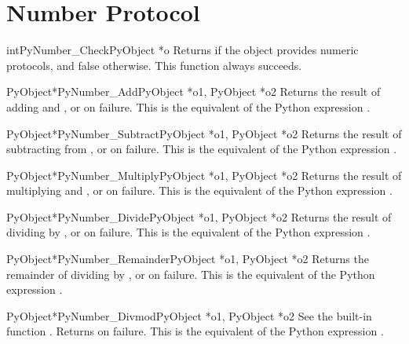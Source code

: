 \documentclass{manual}
\begin{document}
\section{Number Protocol \label{number}}

\begin{cfuncdesc}{int}{PyNumber_Check}{PyObject *o}
Returns  if the object  provides numeric protocols, and
false otherwise. 
This function always succeeds.
\end{cfuncdesc}


\begin{cfuncdesc}{PyObject*}{PyNumber_Add}{PyObject *o1, PyObject *o2}
Returns the result of adding  and , or \NULL{} on
failure.  This is the equivalent of the Python expression
.
\end{cfuncdesc}


\begin{cfuncdesc}{PyObject*}{PyNumber_Subtract}{PyObject *o1, PyObject *o2}
Returns the result of subtracting  from , or
\NULL{} on failure.  This is the equivalent of the Python expression
.
\end{cfuncdesc}


\begin{cfuncdesc}{PyObject*}{PyNumber_Multiply}{PyObject *o1, PyObject *o2}
Returns the result of multiplying  and , or \NULL{} on
failure.  This is the equivalent of the Python expression
.
\end{cfuncdesc}


\begin{cfuncdesc}{PyObject*}{PyNumber_Divide}{PyObject *o1, PyObject *o2}
Returns the result of dividing  by , or \NULL{} on
failure. 
This is the equivalent of the Python expression .
\end{cfuncdesc}


\begin{cfuncdesc}{PyObject*}{PyNumber_Remainder}{PyObject *o1, PyObject *o2}
Returns the remainder of dividing  by , or \NULL{} on
failure.  This is the equivalent of the Python expression
.
\end{cfuncdesc}


\begin{cfuncdesc}{PyObject*}{PyNumber_Divmod}{PyObject *o1, PyObject *o2}
See the built-in function .
Returns \NULL{} on failure.  This is the equivalent of the Python
expression .
\end{cfuncdesc}
\end{document}
